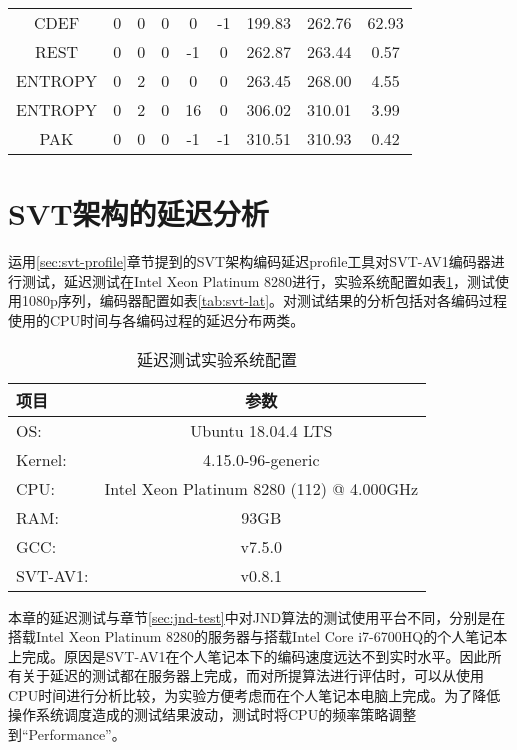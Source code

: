 \begin{table}[htbp]
\begin{tabular}{ccccccccc}
    	  CDEF   &   0    &    0    &   0    &   0    &   -1    & 199.83 & 262.76 &  62.93   \\
    	  REST   &   0    &    0    &   0    &   -1   &    0    & 262.87 & 263.44 &   0.57   \\
    	ENTROPY  &   0    &    2    &   0    &   0    &    0    & 263.45 & 268.00 &   4.55   \\
    	ENTROPY  &   0    &    2    &   0    &   16   &    0    & 306.02 & 310.01 &   3.99   \\
    	  PAK    &   0    &    0    &   0    &   -1   &   -1    & 310.51 & 310.93 &   0.42   \\ \bottomrule
    \end{tabular}
  \end{table}

\section{SVT架构的延迟分析}
运用\ref{sec:svt-profile}章节提到的SVT架构编码延迟profile工具对SVT-AV1编码器进行测试，延迟测试在Intel Xeon Platinum 8280进行，实验系统配置如表\ref{tab:os-8280}，测试使用1080p序列，编码器配置如表\ref{tab:svt-lat}。对测试结果的分析包括对各编码过程使用的CPU时间与各编码过程的延迟分布两类。

\begin{table}[htbp]
	\renewcommand{\arraystretch}{0.9}
	\caption{延迟测试实验系统配置}
	\label{tab:os-8280}
	\centering
	\begin{tabular}{lc} \toprule
		项目& 参数  \\ \midrule
		OS:     &Ubuntu 18.04.4 LTS\\
		Kernel: & 4.15.0-96-generic\\
		CPU:    &Intel Xeon Platinum 8280 (112) @ 4.000GHz\\
		RAM:    &93GB\\
		GCC:    &v7.5.0\\
		SVT-AV1: & v0.8.1\\ \bottomrule
	\end{tabular}
\end{table}

本章的延迟测试与章节\ref{sec:jnd-test}中对JND算法的测试使用平台不同，分别是在搭载Intel Xeon Platinum 8280的服务器与搭载Intel Core i7-6700HQ的个人笔记本上完成。原因是SVT-AV1在个人笔记本下的编码速度远达不到实时水平。因此所有关于延迟的测试都在服务器上完成，而对所提算法进行评估时，可以从使用CPU时间进行分析比较，为实验方便考虑而在个人笔记本电脑上完成。为了降低操作系统调度造成的测试结果波动，测试时将CPU的频率策略调整到“Performance”。

